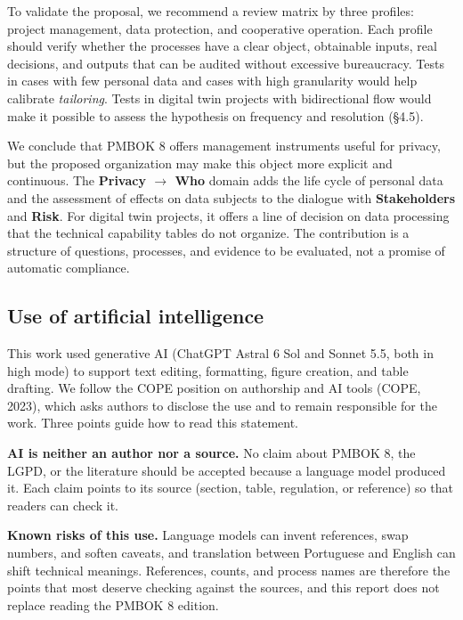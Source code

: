 \documentclass[11pt,a4paper]{article}
\newif\ifavisofinal  \avisofinaltrue    %
\begin{document}
To validate the proposal, we recommend a review matrix by three profiles: project management, data protection, and cooperative operation. Each profile should verify whether the processes have a clear object, obtainable inputs, real decisions, and outputs that can be audited without excessive bureaucracy. Tests in cases with few personal data and cases with high granularity would help calibrate \textit{tailoring}. Tests in digital twin projects with bidirectional flow would make it possible to assess the hypothesis on frequency and resolution (§4.5).

We conclude that PMBOK 8 offers management instruments useful for privacy, but the proposed organization may make this object more explicit and continuous. The \textbf{Privacy \ensuremath{\rightarrow} Who} domain adds the life cycle of personal data and the assessment of effects on data subjects to the dialogue with \textbf{Stakeholders} and \textbf{Risk}. For digital twin projects, it offers a line of decision on data processing that the technical capability tables do not organize. The contribution is a structure of questions, processes, and evidence to be evaluated, not a promise of automatic compliance.

\ifavisofinal
\subsection{Use of artificial intelligence}

This work used generative AI (ChatGPT Astral 6 Sol and Sonnet 5.5, both in high mode) to support text editing, formatting, figure creation, and table drafting. We follow the COPE position on authorship and AI tools (COPE, 2023), which asks authors to disclose the use and to remain responsible for the work. Three points guide how to read this statement.

\textbf{AI is neither an author nor a source.} No claim about PMBOK 8, the LGPD, or the literature should be accepted because a language model produced it. Each claim points to its source (section, table, regulation, or reference) so that readers can check it.

\textbf{Known risks of this use.} Language models can invent references, swap numbers, and soften caveats, and translation between Portuguese and English can shift technical meanings. References, counts, and process names are therefore the points that most deserve checking against the sources, and this report does not replace reading the PMBOK 8 edition.
\end{document}
